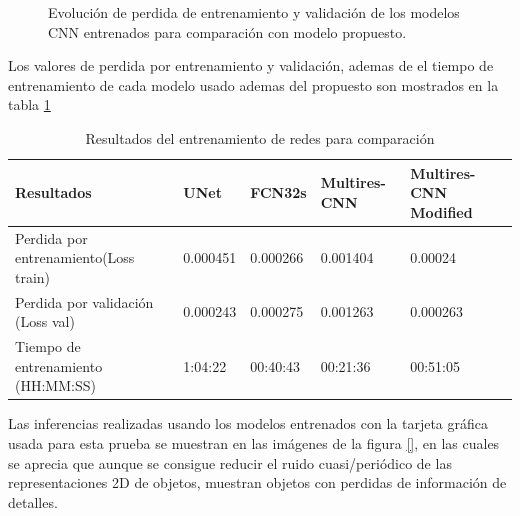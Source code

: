 \documentclass[10pt,letterpaper]{article}
\begin{document}
\begin{figure}[H]
      \begin{center}
        \caption{Evolución de perdida de entrenamiento y validación de los modelos CNN entrenados para comparación con modelo propuesto.}
        \label{tif132}
      \end{center}
\end{figure}

Los valores de perdida por entrenamiento y validación, ademas de el tiempo de entrenamiento de cada modelo usado ademas del propuesto son mostrados en la tabla \ref{resultadoscomparacionGTX1070}

\begin{table}[H]
\begin{center}
\begin{tabular}{ p{1.8cm}  p{1.5cm}  p{1.5cm}  p{2.2cm}  p{2.4cm} }
\hline
Resultados & UNet & FCN32s & Multires-CNN & Multires-CNN Modified\\	
\hline
Perdida por entrenamiento(Loss train) & 0.000451  & 0.000266 & 0.001404 & 0.00024 \\
\hline
Perdida por validación (Loss val) 	  & 0.000243 & 0.000275 & 0.001263 & 0.000263 \\
\hline
Tiempo de entrenamiento (HH:MM:SS)    & 1:04:22 & 00:40:43 & 00:21:36 & 00:51:05 \\
\hline
\end{tabular}
\caption{Resultados del entrenamiento de redes para comparación}
\label{resultadoscomparacionGTX1070}
\end{center}
\end{table}

Las inferencias realizadas usando los modelos entrenados con la tarjeta gráfica usada para esta prueba se muestran en las imágenes de la figura \ref{}, en las cuales se aprecia que aunque se consigue reducir el ruido cuasi/periódico de las representaciones 2D de objetos, muestran objetos con perdidas de información de detalles.
\end{document}
